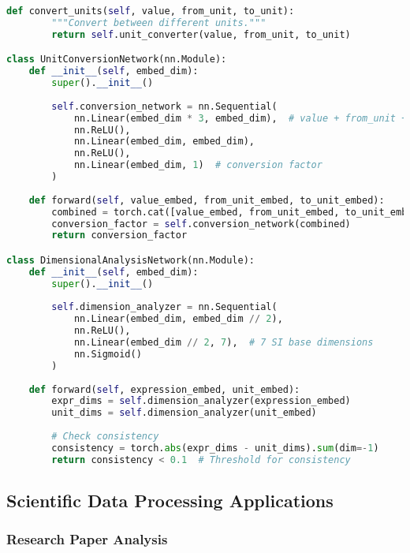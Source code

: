 \begin{lstlisting}[language=Python, caption=Unit-aware scientific computing tokens]
    def convert_units(self, value, from_unit, to_unit):
        """Convert between different units."""
        return self.unit_converter(value, from_unit, to_unit)

class UnitConversionNetwork(nn.Module):
    def __init__(self, embed_dim):
        super().__init__()
        
        self.conversion_network = nn.Sequential(
            nn.Linear(embed_dim * 3, embed_dim),  # value + from_unit + to_unit
            nn.ReLU(),
            nn.Linear(embed_dim, embed_dim),
            nn.ReLU(),
            nn.Linear(embed_dim, 1)  # conversion factor
        )
        
    def forward(self, value_embed, from_unit_embed, to_unit_embed):
        combined = torch.cat([value_embed, from_unit_embed, to_unit_embed], dim=-1)
        conversion_factor = self.conversion_network(combined)
        return conversion_factor

class DimensionalAnalysisNetwork(nn.Module):
    def __init__(self, embed_dim):
        super().__init__()
        
        self.dimension_analyzer = nn.Sequential(
            nn.Linear(embed_dim, embed_dim // 2),
            nn.ReLU(),
            nn.Linear(embed_dim // 2, 7),  # 7 SI base dimensions
            nn.Sigmoid()
        )
        
    def forward(self, expression_embed, unit_embed):
        expr_dims = self.dimension_analyzer(expression_embed)
        unit_dims = self.dimension_analyzer(unit_embed)
        
        # Check consistency
        consistency = torch.abs(expr_dims - unit_dims).sum(dim=-1)
        return consistency < 0.1  # Threshold for consistency
\end{lstlisting}

\subsection{Scientific Data Processing Applications}

\subsubsection{Research Paper Analysis}

